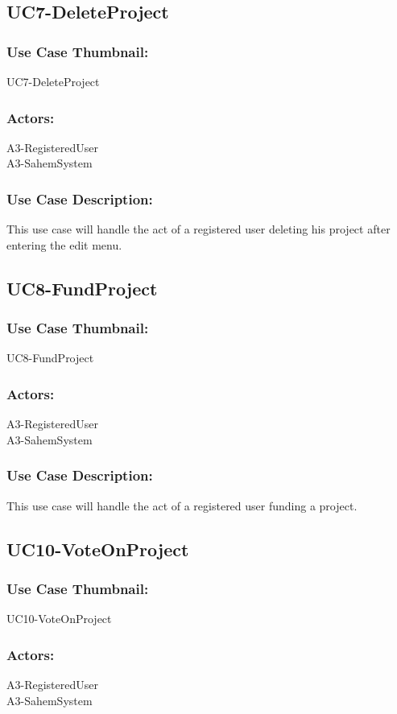 \documentclass[11pt, openany]{report}
\begin{document}
\subsection{UC7-DeleteProject}
\label{sUC7}
\subsubsection*{Use Case Thumbnail:}
UC7-DeleteProject
\subsubsection*{Actors:}
A3-RegisteredUser\\
A3-SahemSystem

\subsubsection*{Use Case Description:}
This use case will handle the act of a registered user deleting his project after entering the edit menu.

\subsection{UC8-FundProject}
\label{sUC8}
\subsubsection*{Use Case Thumbnail:}
UC8-FundProject
\subsubsection*{Actors:}
A3-RegisteredUser\\
A3-SahemSystem

\subsubsection*{Use Case Description:}
This use case will handle the act of a registered user funding a project.

\subsection{UC10-VoteOnProject}
\label{sUC10}
\subsubsection*{Use Case Thumbnail:}
UC10-VoteOnProject
\subsubsection*{Actors:}
A3-RegisteredUser\\
A3-SahemSystem
\end{document}
